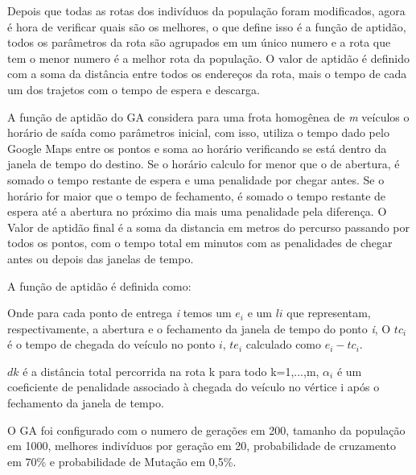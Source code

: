Depois que todas as rotas dos indivíduos da população foram modificados, agora é hora de verificar quais são os melhores, o que define isso é a função de aptidão, todos os parâmetros da rota são agrupados em um único numero e a rota que tem o menor numero é a melhor rota da população. O valor de aptidão é definido com a soma da distância entre todos os endereços da rota, mais o tempo de cada um dos trajetos com o tempo de espera e descarga.

A função de aptidão do GA considera para uma frota homogênea de \textit{m} veículos o horário de saída como parâmetros inicial, com isso, utiliza o tempo dado pelo Google Maps entre os pontos e soma ao horário verificando se está dentro da janela de tempo do destino. Se o horário calculo for menor que o de abertura, é somado o tempo restante de espera e uma penalidade por chegar antes. Se o horário for maior que o tempo de fechamento, é somado o tempo restante de espera até a abertura no próximo dia mais uma penalidade pela diferença. O Valor de aptidão final é a soma da distancia em metros do percurso passando por todos os pontos, com o tempo total em minutos com as penalidades de chegar antes ou depois das janelas de tempo.

A função de aptidão é definida como:

\begin{center}
	\label{fig:MetodoAptidao}
\end{center}

Onde para cada ponto de entrega \textit{i} temos um \(e_i\)
e um \(li\)  que representam, respectivamente, a abertura e o fechamento
da janela de tempo do ponto \textit{i}, O \(tc_i\) é o tempo de chegada do veículo no ponto \(i\), \(te_i\) calculado como \(e_i - tc_i\). 

\(dk\) é a distância total percorrida na rota k para todo k=1,...,m, \(\alpha_i\)
é um coeficiente de penalidade associado à chegada do veículo no vértice i após o fechamento da janela de tempo.

O GA foi configurado com o numero de gerações em 200, tamanho da população em 1000, melhores indivíduos por geração em 20, probabilidade de cruzamento em 70\% e probabilidade de Mutação em 0,5\%.

